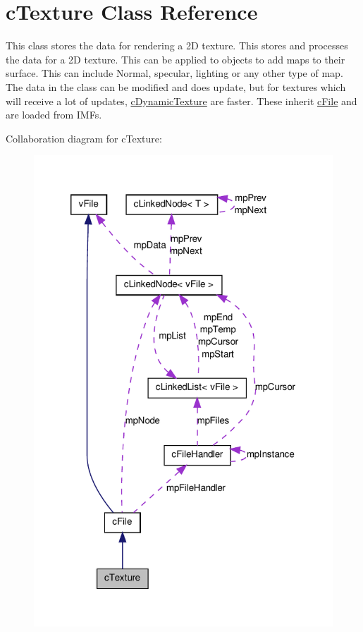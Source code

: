 \hypertarget{classc_texture}{
\section{cTexture Class Reference}
\label{classc_texture}
}


This class stores the data for rendering a 2D texture. This stores and processes the data for a 2D texture. This can be applied to objects to add maps to their surface. This can include Normal, specular, lighting or any other type of map. The data in the class can be modified and does update, but for textures which will receive a lot of updates, \hyperlink{classc_dynamic_texture}{cDynamicTexture} are faster. These inherit \hyperlink{classc_file}{cFile} and are loaded from IMFs.  




Collaboration diagram for cTexture:\nopagebreak
\begin{figure}[H]
\begin{center}
\leavevmode
\includegraphics[width=320pt]{classc_texture__coll__graph}
\end{center}
\end{figure}
